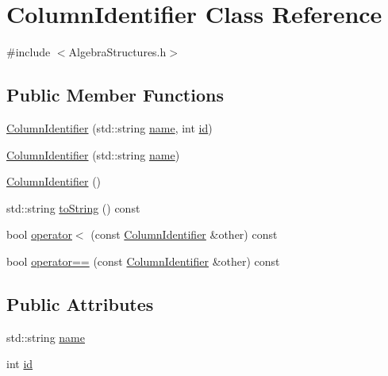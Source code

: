 \hypertarget{class_column_identifier}{\section{Column\+Identifier Class Reference}
\label{class_column_identifier}
}


{\ttfamily \#include $<$Algebra\+Structures.\+h$>$}

\subsection*{Public Member Functions}
\begin{DoxyCompactItemize}
\item 
\hyperlink{class_column_identifier_a3fae121a889e26575b1b2e6ebad16d6e}{Column\+Identifier} (std\+::string \hyperlink{class_column_identifier_af401adcef91c0fb4087102182dddb6ea}{name}, int \hyperlink{class_column_identifier_ade5213e0ceeb1ba3fd948e9dc9975a53}{id})
\item 
\hyperlink{class_column_identifier_ac9bd3a91e6e885751182d082b28d5fb0}{Column\+Identifier} (std\+::string \hyperlink{class_column_identifier_af401adcef91c0fb4087102182dddb6ea}{name})
\item 
\hyperlink{class_column_identifier_a48dc6e1203f91bc58ebf076cfa2a54be}{Column\+Identifier} ()
\item 
std\+::string \hyperlink{class_column_identifier_ae6b2e2ce0ac26d356a451ec3d975a1be}{to\+String} () const 
\item 
bool \hyperlink{class_column_identifier_a07e32ed45a2b7c8e09f0358fd31a1f74}{operator$<$} (const \hyperlink{class_column_identifier}{Column\+Identifier} \&other) const 
\item 
bool \hyperlink{class_column_identifier_a3833af96f5281573cae9a70c440c1cce}{operator==} (const \hyperlink{class_column_identifier}{Column\+Identifier} \&other) const 
\end{DoxyCompactItemize}
\subsection*{Public Attributes}
\begin{DoxyCompactItemize}
\item 
std\+::string \hyperlink{class_column_identifier_af401adcef91c0fb4087102182dddb6ea}{name}
\item 
int \hyperlink{class_column_identifier_ade5213e0ceeb1ba3fd948e9dc9975a53}{id}
\end{DoxyCompactItemize}


